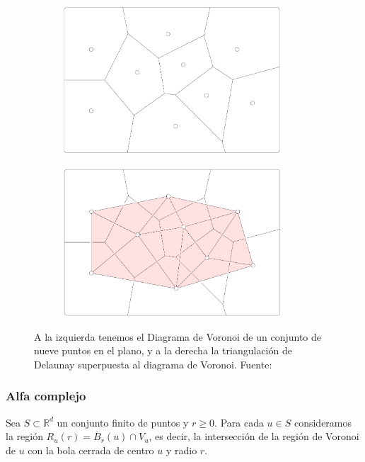\begin{figure}[!ht]
\centering
\begin{subfigure}[b]{0.4\textwidth}
	\centering
	\includegraphics[width=0.9\textwidth]{include/figuras/voronoi.png} 
\end{subfigure}
\begin{subfigure}[b]{0.4\textwidth}
	\centering
	\includegraphics[width=0.9\textwidth]{include/figuras/delaunay.png} 
\end{subfigure}
\caption{A la izquierda tenemos el Diagrama de Voronoi de un conjunto de nueve puntos en el plano, y a la derecha la triangulación de Delaunay superpuesta al diagrama de Voronoi. Fuente: \cite{libroEH}}
\label{ref:vor-del}
\end{figure}

\subsubsection*{Alfa complejo}
Sea $S \subset \mathbb{R}^d$ un conjunto finito de puntos y $r \geq 0$. Para cada $u \in S$ consideramos la región $R_u(r)= \overline{B}_r(u) \cap V_u$, es decir, la intersección de la región de Voronoi de $u$ con la bola cerrada de centro $u$ y radio $r$.


